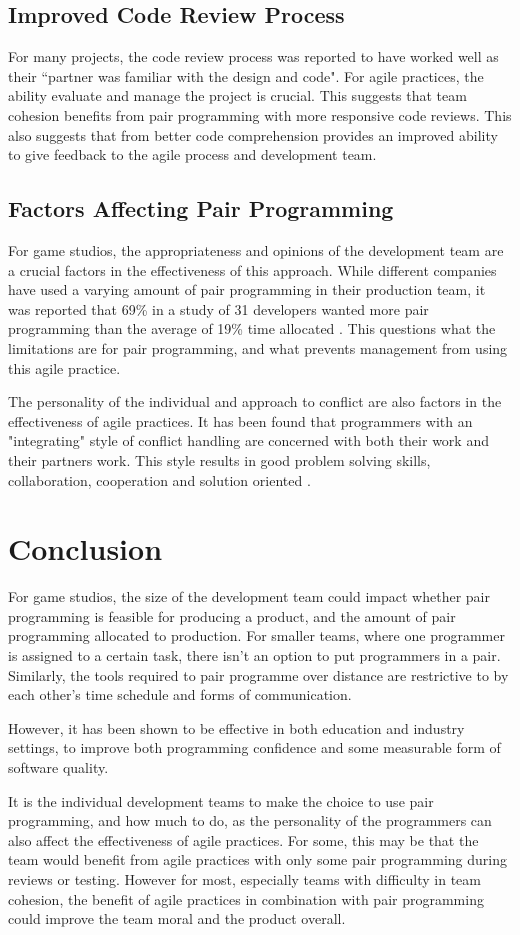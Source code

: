 \documentclass{scrartcl}
\begin{document}
\subsection{Improved Code Review Process}
For many projects, the code review process was reported to have worked well as their ``partner was familiar with the design and code"\cite{Vanhanen:2007}. For agile practices, the ability evaluate and manage the project is crucial. This suggests that team cohesion benefits from pair programming with more responsive code reviews. This also suggests that from better code comprehension provides an improved ability to give feedback to the agile process and development team.

\subsection{Factors Affecting Pair Programming}
For game studios, the appropriateness and opinions of the development team are a crucial factors in the effectiveness of this approach. While different companies have used a varying amount of pair programming in their production team, it was reported that 69\% in a study of 31 developers wanted more pair programming than the average of 19\% time allocated \cite{Plonka:2012}. This questions what the limitations are for pair programming, and what prevents management from using this agile practice.

The personality of the individual and approach to conflict are also factors in the effectiveness of agile practices. It has been found that programmers with an "integrating" style of conflict handling are concerned with both their work and their partners work. This style results in good problem solving skills, collaboration, cooperation and solution oriented \cite{Domino:2003}.

\section*{Conclusion}
For game studios, the size of the development team could impact whether pair programming is feasible for producing a product, and the amount of pair programming allocated to production. For smaller teams, where one programmer is assigned to a certain task, there isn't an option to put programmers in a pair. Similarly, the tools required to pair programme over distance are restrictive to by each other's time schedule and forms of communication.

However, it has been shown to be effective in both education and industry settings, to improve both programming confidence and some measurable form of software quality.

It is the individual development teams to make the choice to use pair programming, and how much to do, as the personality of the programmers can also affect the effectiveness of agile practices. For some, this may be that the team would benefit from agile practices with only some pair programming during reviews or testing. However for most, especially teams with difficulty in team cohesion, the benefit of agile practices in combination with pair programming could improve the team moral and the product overall.



\end{document}
